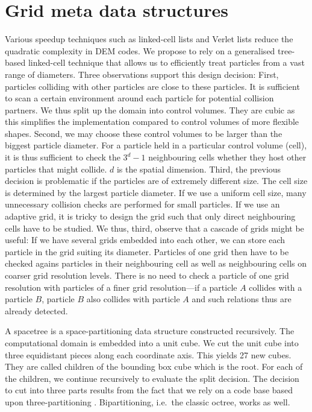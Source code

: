 \section{Grid meta data structures}
\label{section:grid}

Various speedup techniques such as linked-cell lists \cite{Eckhardt2014} and Verlet lists
\cite{Fleissner, Eckhardt2014} reduce the quadratic complexity in DEM codes.
We propose to rely on a generalised tree-based linked-cell
technique that allows us to efficiently treat particles from a vast range of diameters.
Three observations support this design decision:
First, particles colliding with other particles are close to these particles.
It is sufficient to scan a certain environment around each particle for
potential collision partners.
We thus split up the domain into control volumes.
They are cubic as this simplifies the implementation compared to control volumes
of more flexible shapes.
Second, we may choose these control volumes to be larger than the biggest
particle diameter. 
For a particle held in a particular control volume (cell), it is thus sufficient
to check the $3^d-1$ neighbouring cells whether they host other particles that
might collide. 
$d$ is the spatial dimension.
Third, the previous decision is problematic if the particles are of extremely
different size. 
The cell size is determined by the largest particle diameter. 
If we use a uniform cell size, many unnecessary collision checks are performed
for small particles.
If we use an adaptive grid, it is tricky to design the grid such that only
direct neighbouring cells have to be studied.
We thus, third, observe that a cascade of grids might be useful: If we have
several grids embedded into each other, we can store each particle in the grid
suiting its diameter.
Particles of one grid then have to be checked agains particles in their
neighbouring cell as well as neighbouring cells on coarser grid resolution
levels.
There is no need to check a particle of one grid resolution with particles of a
finer grid resolution---if a particle $A$ collides with a particle $B$, particle
$B$ also collides with particle $A$ and such relations thus are already
detected.

A spacetree is a space-partitioning data structure constructed recursively.
The computational domain is embedded into a unit cube.
We cut the unit cube into three equidistant pieces along each coordinate axis. 
This yields 27 new cubes. 
They are called children of the bounding box cube which is the root.
For each of the children, we continue recursively to evaluate the split
decision. 
The decision to cut into three parts results from the fact that we rely on a
code base based upon three-partitioning \cite{Software:Peano}.
Bipartitioning, i.e.~the classic octree, works as well.


